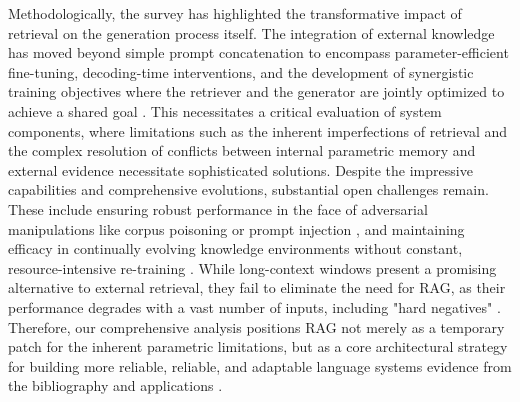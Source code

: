 \documentclass[11pt,a4paper]{article}
\begin{document}
Methodologically, the survey has highlighted the transformative impact of retrieval on the generation process itself. The integration of external knowledge has moved beyond simple prompt concatenation to encompass parameter-efficient fine-tuning, decoding-time interventions, and the development of synergistic training objectives where the retriever and the generator are jointly optimized to achieve a shared goal \cite{arxiv:2110.07752v2}. This necessitates a critical evaluation of system components, where limitations such as the inherent imperfections of retrieval \cite{arxiv:2401.14887v3} and the complex resolution of conflicts between internal parametric memory and external evidence \cite{arxiv:2410.07176v2} necessitate sophisticated solutions. Despite the impressive capabilities and comprehensive evolutions, substantial open challenges remain. These include ensuring robust performance in the face of adversarial manipulations like corpus poisoning or prompt injection \cite{arxiv:2509.23519v2,arxiv:2401.05856v1}, and maintaining efficacy in continually evolving knowledge environments without constant, resource-intensive re-training \cite{arxiv:2505.17005v1,arxiv:2502.14802v2}. While long-context windows present a promising alternative to external retrieval, they fail to eliminate the need for RAG, as their performance degrades with a vast number of inputs, including "hard negatives" \cite{arxiv:2410.05983v1,arxiv:2401.05856v1}. Therefore, our comprehensive analysis positions RAG not merely as a temporary patch for the inherent parametric limitations, but as a core architectural strategy for building more reliable, reliable, and adaptable language systems \cite{arxiv:2403.03187v1} evidence from the bibliography and applications \cite{arxiv:2410.15944v1}.
\end{document}
